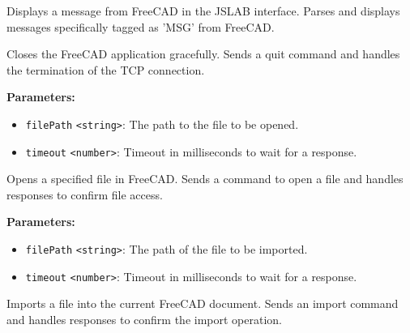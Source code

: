 \documentclass[12pt,a4paper]{article}
\begin{document}
\noindent Displays a message from FreeCAD in the JSLAB interface.
Parses and displays messages specifically tagged as 'MSG' from FreeCAD.

\vspace{5mm}
\noindent {}


\noindent Closes the FreeCAD application gracefully.
Sends a quit command and handles the termination of the TCP connection.

\vspace{5mm}
\noindent {}


\noindent \textbf{Parameters:}
\begin{itemize}
  \item \texttt{filePath} \texttt{<string>}: The path to the file to be opened.
  \item \texttt{timeout} \texttt{<number>}: Timeout in milliseconds to wait for a response.
\end{itemize}

\noindent Opens a specified file in FreeCAD.
Sends a command to open a file and handles responses to confirm file access.

\vspace{5mm}
\noindent {}


\noindent \textbf{Parameters:}
\begin{itemize}
  \item \texttt{filePath} \texttt{<string>}: The path of the file to be imported.
  \item \texttt{timeout} \texttt{<number>}: Timeout in milliseconds to wait for a response.
\end{itemize}

\noindent Imports a file into the current FreeCAD document.
Sends an import command and handles responses to confirm the import operation.

\vspace{5mm}
\noindent {}
\end{document}
